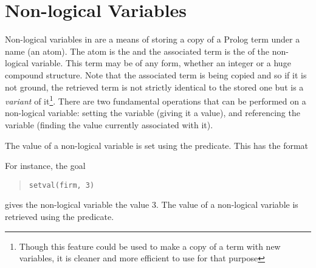 \section{Non-logical Variables}
Non-logical variables in {\eclipse} are a means of storing a copy
of a Prolog term under a name (an atom).
The atom is the  and the associated
term is the  of the non-logical variable.
This term may be of any form, whether an integer or a huge compound
structure.
Note that the associated term is being copied and so if it is not ground,
the retrieved term is not strictly identical to the stored one
but is a \emph{variant} of it\footnote{%
  Though this feature could be used to make a copy of a term with new variables,
  it is cleaner and more efficient to use
   for that
  purpose}.
There are two fundamental operations that can be performed on a non-logical
variable:
setting the variable (giving it a value), and referencing the variable
(finding the value currently associated with it).

The value of a non-logical variable is set using the
predicate.
This has the format
\begin{quote}
\end{quote}
For instance, the goal
\begin{quote}
\begin{verbatim}
setval(firm, 3)
\end{verbatim}
\end{quote}
gives the non-logical variable  the value 3.
The value of a non-logical variable is retrieved using the
predicate.

